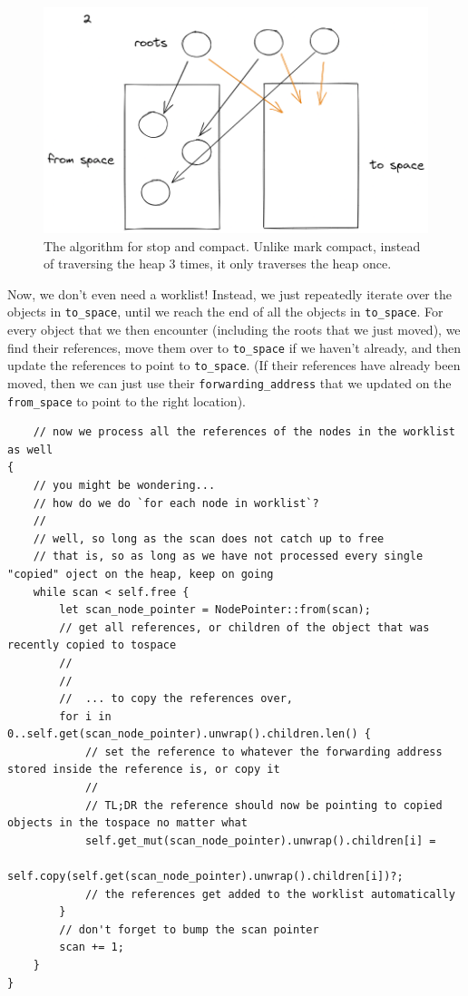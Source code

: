 \documentclass[index]{subfiles}
\begin{document}
\begin{figure}[H]
    \centering
    \includegraphics[scale=0.3]{pics/visualization-of-worklist.png}
    \caption{The algorithm for stop and compact. Unlike mark compact, instead of traversing the heap 3 times, it only traverses the heap once.}
\end{figure}

Now, we don't even need a worklist! Instead, we just repeatedly iterate over the objects in \verb+to_space+, until we reach the end of all the objects in \verb+to_space+. For every object that we then encounter (including the roots that we just moved), we find their references, move them over to \verb+to_space+ if we haven't already, and then update the references to point to \verb+to_space+. (If their references have already been moved, then we can just use their \verb+forwarding_address+ that we updated on the \verb+from_space+ to point to the right location).

\begin{verbatim}
    // now we process all the references of the nodes in the worklist as well
{
    // you might be wondering...
    // how do we do `for each node in worklist`?
    //
    // well, so long as the scan does not catch up to free
    // that is, so as long as we have not processed every single "copied" oject on the heap, keep on going
    while scan < self.free {
        let scan_node_pointer = NodePointer::from(scan);
        // get all references, or children of the object that was recently copied to tospace
        //
        //
        //  ... to copy the references over,
        for i in 0..self.get(scan_node_pointer).unwrap().children.len() {
            // set the reference to whatever the forwarding address stored inside the reference is, or copy it
            //
            // TL;DR the reference should now be pointing to copied objects in the tospace no matter what
            self.get_mut(scan_node_pointer).unwrap().children[i] =
                self.copy(self.get(scan_node_pointer).unwrap().children[i])?;
            // the references get added to the worklist automatically
        }
        // don't forget to bump the scan pointer
        scan += 1;
    }
}
\end{verbatim}
\end{document}
